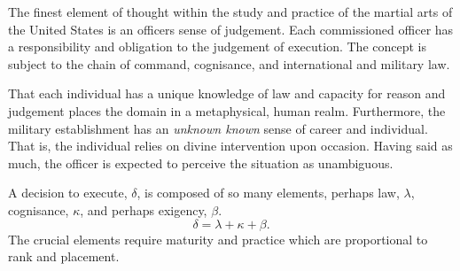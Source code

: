 

The finest element of thought within the study and practice of the
martial arts of the United States is an officers sense of judgement.
Each commissioned officer has a responsibility and obligation to the
judgement of execution.  The concept is subject to the chain of
command, cognisance, and international and military law.  

That each individual has a unique knowledge of law and capacity for
reason and judgement places the domain in a metaphysical, human realm.
Furthermore, the military establishment has an {\it unknown known}
sense of career and individual.  That is, the individual relies on
divine intervention upon occasion.  Having said as much, the officer
is expected to perceive the situation as unambiguous.  

A decision to execute, $\delta$, is composed of so many elements,
perhaps law, $\lambda$, cognisance, $\kappa$, and perhaps exigency,
$\beta$.  $$ \delta = \lambda + \kappa + \beta.$$  The crucial
elements require maturity and practice which are proportional to rank
and placement.

\bye
